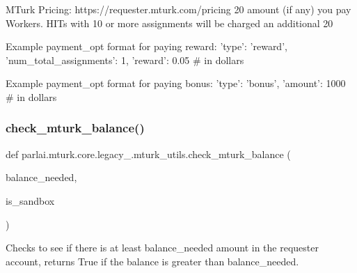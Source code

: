 \begin{DoxyVerb}MTurk Pricing: https://requester.mturk.com/pricing 20%
amount (if any) you pay Workers. HITs with 10 or more assignments will be charged an
additional 20%

Example payment_opt format for paying reward:
{
    'type': 'reward',
    'num_total_assignments': 1,
    'reward': 0.05  # in dollars
}

Example payment_opt format for paying bonus:
{
    'type': 'bonus',
    'amount': 1000  # in dollars
}
\end{DoxyVerb}
 \mbox{\label{namespaceparlai_1_1mturk_1_1core_1_1legacy__2018_1_1mturk__utils_a49df282ab2a8eb03654fdc7817187d6a}} 
\subsubsection{\texorpdfstring{check\+\_\+mturk\+\_\+balance()}{check\_mturk\_balance()}}
{\footnotesize\ttfamily def parlai.\+mturk.\+core.\+legacy\+\_.\+mturk\+\_\+utils.\+check\+\_\+mturk\+\_\+balance (\begin{DoxyParamCaption}\item[{}]{balance\+\_\+needed,  }\item[{}]{is\+\_\+sandbox }\end{DoxyParamCaption})}

\begin{DoxyVerb}Checks to see if there is at least balance_needed amount in the requester account,
returns True if the balance is greater than balance_needed.
\end{DoxyVerb}
 \mbox{\label{namespaceparlai_1_1mturk_1_1core_1_1legacy__2018_1_1mturk__utils_ae67dcf42ca4a1c4022ddac967265b474}} 
